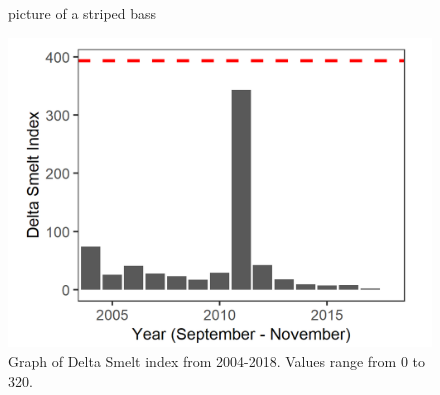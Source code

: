 \documentclass[
]{book}
\begin{document}
\begin{panel-grid}
\begin{columns-nocenter}
\begin{column800}
\begin{figure}
{}

\caption{picture of a striped bass}\label{fig:unnamed-chunk-138}
\end{figure}

\end{column800}

\end{columns-nocenter}

\begin{columns-nocenter}

\begin{column800}

\begin{expand}

\begin{figure}
\includegraphics[width=15.25in]{figures/FMWT_DS_2004} \caption{Graph of Delta Smelt index from 2004-2018. Values range from 0 to 320.}\label{fig:unnamed-chunk-139}
\end{figure}

\end{expand}

\end{column800}

\begin{column40}

~

\end{column40}

\begin{column800}

\begin{expand}


\end{expand}
\end{column800}
\end{columns-nocenter}
\end{panel-grid}
\end{document}
